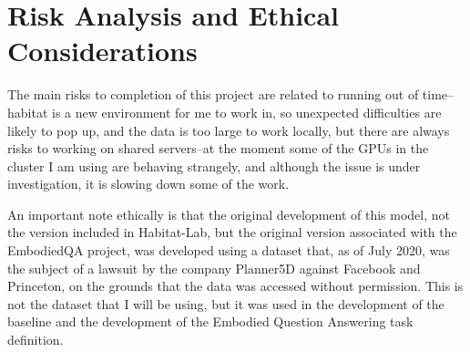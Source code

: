 \documentclass{article}
\begin{document}
\section{Risk Analysis and Ethical Considerations}
The main risks to completion of this project are related to running out of time--habitat is a new environment for me to work in, so unexpected difficulties are likely to pop up, and the data is too large to work locally, but there are always risks to working on shared servers--at the moment some of the GPUs in the cluster I am using are behaving strangely, and although the issue is under investigation, it is slowing down some of the work. 

An important note ethically is that the original development of this model, not the version included in Habitat-Lab, but the original version associated with the EmbodiedQA project, was developed using a dataset that, as of July 2020, was the subject of a lawsuit by the company Planner5D against Facebook and Princeton, on the grounds that the data was accessed without permission\cite{planner5d}. This is not the dataset that I will be using, but it was used in the development of the baseline and the development of the Embodied Question Answering task definition. 




\end{document}
